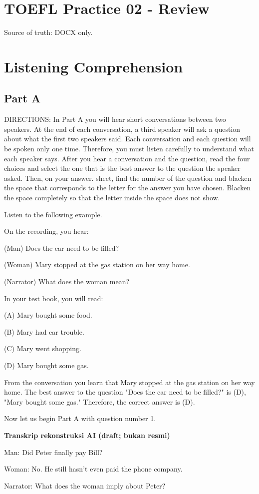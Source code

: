 \documentclass[12pt]{article}
\begin{document}
\section*{TOEFL Practice 02 - Review}
Source of truth: DOCX only.
\section*{Listening Comprehension}
\subsection*{Part A}
DIRECTIONS: In Part A you will hear short conversations between two speakers. At the end of each conversation, a third speaker will ask a question about what the first two speakers said. Each conversation and each question will be spoken only one time. Therefore, you must listen carefully to understand what each speaker says. After you hear a conversation and the question, read the four choices and select the one that is the best answer to the question the speaker asked. Then, on your answer. sheet, find the number of the question and blacken the space that corresponds to the letter for the answer you have chosen. Blacken the space completely so that the letter inside the space does not show.\par
\begin{exampleblock}
Listen to the following example.\par
On the recording, you hear:\par
(Man) Does the car need to be filled?\par
(Woman) Mary stopped at the gas station on her way home.\par
(Narrator) What does the woman mean?\par
In your test book, you will read:\par
(A) Mary bought some food.\par
(B) Mary had car trouble.\par
(C) Mary went shopping.\par
(D) Mary bought some gas.\par
From the conversation you learn that Mary stopped at the gas station on her way home. The best answer to the question "Does the car need to be filled?" is (D), "Mary bought some gas." Therefore, the correct answer is (D).\par
Now let us begin Part A with question number 1.\par
\end{exampleblock}
\begin{exampleblock}
\textbf{Transkrip rekonstruksi AI (draft; bukan resmi)}\par
Man: Did Peter finally pay Bill?\par
Woman: No. He still hasn't even paid the phone company.\par
Narrator: What does the woman imply about Peter?\par
\end{exampleblock}
\end{document}
